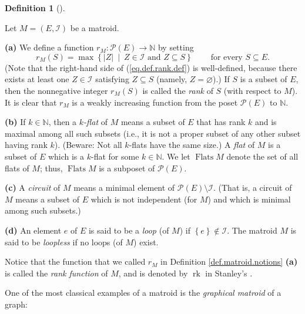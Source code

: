 \documentclass[numbers=enddot,12pt,final,onecolumn,notitlepage]{scrartcl}%
\theoremstyle{definition}
\newtheorem{defi}[theo]{Definition}
\newenvironment{definition}[1][]
{\begin{defi}[#1]\begin{leftbar}}
{\end{leftbar}\end{defi}}
\begin{document}
\begin{definition}
\label{def.matroid.notions}Let $M=\left(  E,\mathcal{I}\right)  $ be a matroid.

\textbf{(a)} We define a function $r_{M}:\mathcal{P}\left(  E\right)
\rightarrow\mathbb{N}$ by setting%
\begin{equation}
r_{M}\left(  S\right)  =\max\left\{  \left\vert Z\right\vert \ \mid
\ Z\in\mathcal{I}\text{ and }Z\subseteq S\right\}
\ \ \ \ \ \ \ \ \ \ \text{for every }S\subseteq E. \label{eq.def.rank.def}%
\end{equation}
(Note that the right-hand side of (\ref{eq.def.rank.def}) is well-defined,
because there exists at least one $Z\in\mathcal{I}$ satisfying $Z\subseteq S$
(namely, $Z=\varnothing$).) If $S$ is a subset of $E$, then the nonnegative
integer $r_{M}\left(  S\right)  $ is called the \emph{rank} of $S$ (with
respect to $M$). It is clear that $r_{M}$ is a weakly increasing function from
the poset $\mathcal{P}\left(  E\right)  $ to $\mathbb{N}$.

\textbf{(b)} If $k\in\mathbb{N}$, then a $k$\emph{-flat} of $M$ means a subset
of $E$ that has rank $k$ and is maximal among all such subsets (i.e., it is
not a proper subset of any other subset having rank $k$). (Beware: Not all
$k$-flats have the same size.) A \emph{flat} of $M$ is a subset of $E$ which
is a $k$-flat for some $k\in\mathbb{N}$. We let $\operatorname*{Flats}M$
denote the set of all flats of $M$; thus, $\operatorname*{Flats}M$ is a
subposet of $\mathcal{P}\left(  E\right)  $.

\textbf{(c)} A \emph{circuit} of $M$ means a minimal element of $\mathcal{P}%
\left(  E\right)  \setminus\mathcal{I}$. (That is, a circuit of $M$ means a
subset of $E$ which is not independent (for $M$) and which is minimal among
such subsets.)

\textbf{(d)} An element $e$ of $E$ is said to be a \emph{loop} (of $M$) if
$\left\{  e\right\}  \notin\mathcal{I}$. The matroid $M$ is said to be
\emph{loopless} if no loops (of $M$) exist.
\end{definition}

Notice that the function that we called $r_{M}$ in Definition
\ref{def.matroid.notions} \textbf{(a)} is called the \emph{rank function} of
$M$, and is denoted by $\operatorname*{rk}$ in Stanley's \cite[Lecture
3]{Stanley}.

One of the most classical examples of a matroid is the \emph{graphical
matroid} of a graph:
\end{document}
